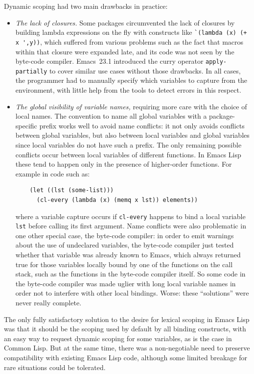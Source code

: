 \documentclass[format=acmsmall,screen]{acmart}
\newcommand \Elisp {Emacs Lisp}
\begin{document}
Dynamic scoping had two main drawbacks in practice:
\begin{itemize}
\item \textit{The lack of closures.}
  Some packages circumvented the lack of closures
  by building lambda expressions on the fly with constructs like
  \verb|`(lambda (x) (+ x ',y))|, which suffered from various problems
  such as the fact that macros within that closure were expanded late, and
  its code was not seen by the byte-code compiler.  Emacs~23.1 introduced the
  curry operator \texttt{apply-partially} to cover similar use cases without
  those drawbacks.  In all cases, the programmer had to manually specify
  which variables to capture from the environment, with little help
  from the tools to detect errors in this respect.
\item \textit{The global visibility of variable names,} requiring more care with the
  choice of local names.  The convention to name all
  global variables with a package-specific prefix works well to avoid name
  conflicts: it not only avoids conflicts between global variables, but also
  between local variables and global variables since local variables do not
  have such a prefix.  The only remaining possible conflicts occur between
  local variables of different functions.  In \Elisp{} these tend to happen only
  in the presence of higher-order functions.  For example in code such as:
\begin{verbatim}
    (let ((lst (some-list)))
      (cl-every (lambda (x) (memq x lst)) elements))
\end{verbatim}
  where a variable capture occurs if \texttt{cl-every} happens to bind a local
  variable \texttt{lst} before calling its first argument.  Name conflicts
  were also problematic in one other special case, the byte-code compiler: in
  order to emit warnings about the use of undeclared variables, the
  byte-code compiler just tested whether that variable was already known to
  Emacs, which always returned true for those variables locally bound by one
  of the functions on the call stack, such as the functions in the
  byte-code compiler itself.  So some code in the byte-code compiler was made uglier
  with long local variable names in order not to interfere with other local
  bindings.  Worse: these ``solutions'' were never really complete.
\end{itemize}
The only fully satisfactory solution to the desire for lexical scoping in
\Elisp{} was that it should be the scoping used by default by all binding
constructs, with an easy way to request dynamic scoping for some
variables, as is the case in Common Lisp.  But at the same time, there was
a non-negotiable need to preserve compatibility with existing \Elisp{} code,
although some limited breakage for rare situations could be tolerated.
\end{document}
